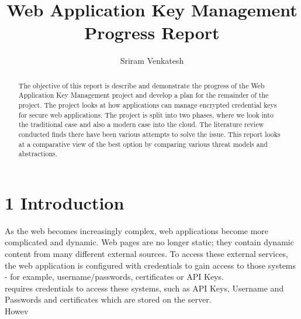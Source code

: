 \documentclass[11pt, a4paper, twoside, openright, notitlepage]{report}
\title{Web Application Key Management Progress Report}
\author{Sriram Venkatesh}
\date{}
\begin{document}
\frontmatter


\begin{abstract}
The objective of this report is describe and demonstrate the progress of the Web Application Key Management project and develop a plan for the remainder of the project. The project looks at how applications can manage encrypted credential keys for secure web applications. The project is split into two phases, where we look into the traditional case and also a modern case into the cloud. The literature review conducted finds there have been various attempts to solve the issue. This report looks at a comparative view of the best option by comparing various threat models and abstractions. 
\end{abstract}


\maketitle




\mainmatter


\section*{1 Introduction}
As the web becomes increasingly complex, web applications become more complicated and dynamic. Web pages are no longer static; they contain dynamic content from many different external sources. To access these external services, the web application is configured with credentials to gain access to those systems - for example, username/passwords, certificates or API Keys. \\



requires credentials to access these systems, such as API Keys, Username and Passwords and certificates which are stored on the server. \\

Howev
\end{document}
